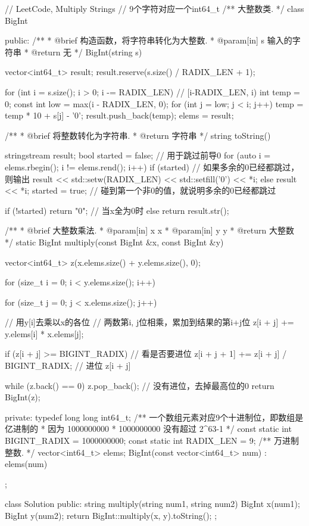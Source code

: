 \begin{Code}
// LeetCode, Multiply Strings
// 9个字符对应一个int64_t
/** 大整数类. */
class BigInt {
public:
    /**
     * @brief 构造函数，将字符串转化为大整数.
     * @param[in] s 输入的字符串
     * @return 无
     */
    BigInt(string s) {
        vector<int64_t> result;
        result.reserve(s.size() / RADIX_LEN + 1);

        for (int i = s.size(); i > 0; i -= RADIX_LEN) {  // [i-RADIX_LEN, i)
            int temp = 0;
            const int low = max(i - RADIX_LEN, 0);
            for (int j = low; j < i; j++) {
                temp = temp * 10 + s[j] - '0';
            }
            result.push_back(temp);
        }
        elems = result;
    }
    /**
     * @brief 将整数转化为字符串.
     * @return 字符串
     */
    string toString() {
        stringstream result;
        bool started = false; // 用于跳过前导0
        for (auto i = elems.rbegin(); i != elems.rend(); i++) {
            if (started) { // 如果多余的0已经都跳过，则输出
                result << std::setw(RADIX_LEN) << std::setfill('0') << *i;
            } else {
                result << *i;
                started = true; // 碰到第一个非0的值，就说明多余的0已经都跳过
            }
        }

        if (!started) return "0"; // 当x全为0时
        else return result.str();
    }

    /**
     * @brief 大整数乘法.
     * @param[in] x x
     * @param[in] y y
     * @return 大整数
     */
    static BigInt multiply(const BigInt &x, const BigInt &y) {
        vector<int64_t> z(x.elems.size() + y.elems.size(), 0);

        for (size_t i = 0; i < y.elems.size(); i++) {
            for (size_t j = 0; j < x.elems.size(); j++) { // 用y[i]去乘以x的各位
                //  两数第i, j位相乘，累加到结果的第i+j位
                z[i + j] += y.elems[i] * x.elems[j];

                if (z[i + j] >= BIGINT_RADIX) { //  看是否要进位
                    z[i + j + 1] += z[i + j] / BIGINT_RADIX; //  进位
                    z[i + j] %
                }
            }
        }
        while (z.back() == 0) z.pop_back();  // 没有进位，去掉最高位的0
        return BigInt(z);
    }

private:
    typedef long long int64_t;
    /** 一个数组元素对应9个十进制位，即数组是亿进制的
     * 因为 1000000000 * 1000000000 没有超过 2^63-1
     */
    const static int BIGINT_RADIX = 1000000000;
    const static int RADIX_LEN = 9;
    /** 万进制整数. */
    vector<int64_t> elems;
    BigInt(const vector<int64_t> num) : elems(num) {}
};


class Solution {
public:
    string multiply(string num1, string num2) {
        BigInt x(num1);
        BigInt y(num2);
        return BigInt::multiply(x, y).toString();
    }
};
\end{Code}


